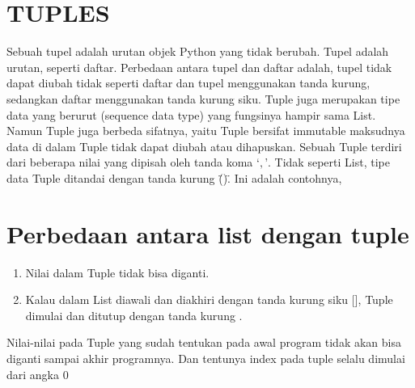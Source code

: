 \section{TUPLES}
Sebuah tupel adalah urutan objek Python yang tidak berubah. Tupel adalah urutan, seperti daftar. Perbedaan antara tupel dan daftar adalah, tupel tidak dapat diubah tidak seperti daftar dan tupel menggunakan tanda kurung, sedangkan daftar menggunakan tanda kurung siku. 
Tuple juga merupakan tipe data yang berurut (sequence data type) yang fungsinya hampir sama List. Namun Tuple juga berbeda sifatnya, yaitu Tuple bersifat immutable maksudnya data di dalam Tuple tidak dapat diubah atau dihapuskan. Sebuah Tuple terdiri dari beberapa nilai yang dipisah oleh tanda koma \(‘,’\). Tidak seperti List, tipe data Tuple ditandai dengan tanda kurung \"()\".
Ini adalah contohnya, 

\section{Perbedaan antara list dengan tuple} 
\begin{enumerate}
\item Nilai dalam Tuple tidak bisa diganti. 
\item Kalau dalam List diawali dan diakhiri dengan tanda kurung siku [], Tuple dimulai dan ditutup dengan tanda kurung \(\). 
\end{enumerate}

Nilai-nilai pada Tuple yang sudah tentukan pada awal program tidak akan bisa diganti sampai akhir programnya. Dan tentunya index pada tuple selalu dimulai dari angka 0 

